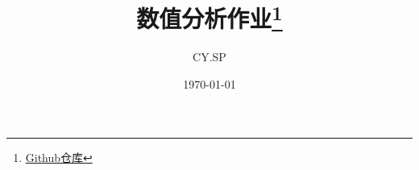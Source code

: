 \documentclass[11pt]{ctexart}
\title{数值分析作业\thanks{\href{https://github.com/Cyclic-S/Numerical_A}{Github仓库}}}
\author{CY.SP}
\date{\today}
\numberwithin{equation}{subsection}
\begin{document}
	\maketitle
	\tableofcontents
	\everymath{\displaystyle}
	\clearpage
	
	
	
	
	
	
	
	
	
	
	
	
\end{document}
